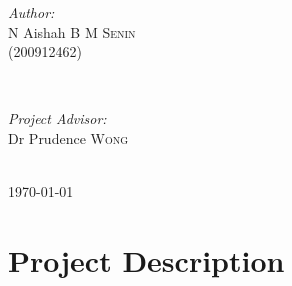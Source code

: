 \documentclass[12pt,a4paper,oneside]{report}
\begin{document}
\begin{titlepage}
\begin{minipage}{0.4\textwidth}
\begin{flushleft} \large
\emph{Author:}\\
N Aishah \textsc{B M Senin} \\ (200912462) %
\end{flushleft}
\end{minipage}
~
\begin{minipage}{0.4\textwidth}
\begin{flushright} \large
\emph{Project Advisor:} \\
Dr Prudence \textsc{Wong} %
\end{flushright}
\end{minipage}\\[2cm]



{\large \today}\\[3cm] %


 

\vfill %

\end{titlepage}

\section*{Project Description}
\end{document}
